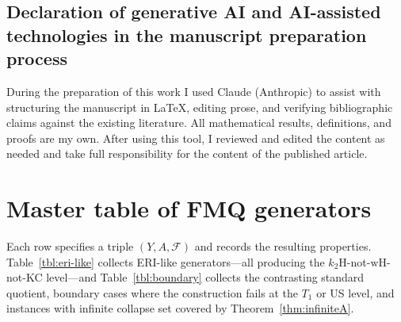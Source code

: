 \documentclass[11pt]{article}
\theoremstyle{definition}
\theoremstyle{remark}
\begin{document}

\subsection*{Declaration of generative AI and AI-assisted technologies
in the manuscript preparation process}

During the preparation of this work I used Claude (Anthropic)
to assist with structuring the manuscript in \LaTeX, editing
prose, and verifying bibliographic claims against the existing
literature.
All mathematical results, definitions, and proofs are my own.
After using this tool, I reviewed and edited the content as
needed and take full responsibility for the content of the published
article.

\appendix
\section{Master table of FMQ generators}\label{app:master}

Each row specifies a triple $(Y, A, \mathcal{F})$ and records the
resulting properties.
Table~\ref{tbl:eri-like} collects ERI-like generators---all producing
the $k_2\mathrm{H}$-not-$\mathrm{wH}$-not-KC level---and
Table~\ref{tbl:boundary} collects the contrasting standard quotient,
boundary cases where the construction fails at the $T_1$ or US level,
and instances with infinite collapse set covered by
Theorem~\ref{thm:infiniteA}.
\end{document}
